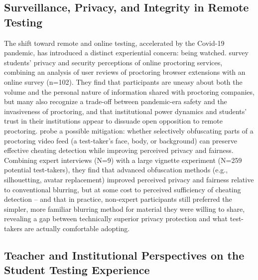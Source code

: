 \documentclass[11pt]{article}
\begin{document}
\subsection{Surveillance, Privacy, and Integrity in Remote Testing}

The shift toward remote and online testing, accelerated by the Covid-19 pandemic, has introduced a distinct experiential concern: being watched. \citet{balash2021examiners} survey students' privacy and security perceptions of online proctoring services, combining an analysis of user reviews of proctoring browser extensions with an online survey (n=102). They find that participants are uneasy about both the volume and the personal nature of information shared with proctoring companies, but many also recognize a trade-off between pandemic-era safety and the invasiveness of proctoring, and that institutional power dynamics and students' trust in their institutions appear to dissuade open opposition to remote proctoring. \citet{mukherjee2024proctoring} probe a possible mitigation: whether selectively obfuscating parts of a proctoring video feed (a test-taker's face, body, or background) can preserve effective cheating detection while improving perceived privacy and fairness. Combining expert interviews (N=9) with a large vignette experiment (N=259 potential test-takers), they find that advanced obfuscation methods (e.g., silhouetting, avatar replacement) improved perceived privacy and fairness relative to conventional blurring, but at some cost to perceived sufficiency of cheating detection -- and that in practice, non-expert participants still preferred the simpler, more familiar blurring method for material they were willing to share, revealing a gap between technically superior privacy protection and what test-takers are actually comfortable adopting.

\subsection{Teacher and Institutional Perspectives on the Student Testing Experience}
\label{sec:teacherperspectives}
\end{document}
